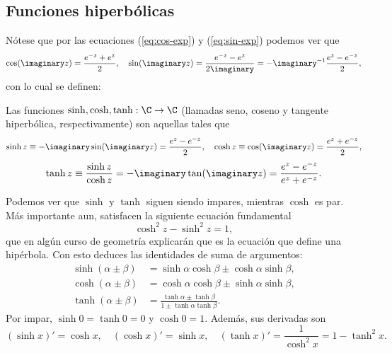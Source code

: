 \documentclass[11pt,oneside,a4paper]{book}
\begin{document}
\subsection*{Funciones hiperbólicas}
Nótese que por las ecuaciones (\ref{eq:cos-exp}) y (\ref{eq:sin-exp}) podemos ver que
$$\cos(\imaginary z)=\frac{e^{-z}+e^z}{2},\quad\sin(\imaginary z)=\frac{e^{-z}-e^z}{2\imaginary}=-\imaginary^{-1}\frac{e^z-e^{-z}}{2},$$
con lo cual se definen:
\begin{mydef}
Las funciones $\sinh,\cosh,\tanh:\C\rightarrow\C$ (llamadas seno, coseno y tangente hiperbólica, respectivamente) son aquellas tales que
$$\sinh z\equiv-\imaginary\sin(\imaginary z)=\frac{e^z-e^{-z}}{2},\quad\cosh z\equiv\cos(\imaginary z)=\frac{e^z+e^{-z}}{2},$$
$$\tanh z\equiv\frac{\sinh z}{\cosh z}=-\imaginary\tan(\imaginary z)=\frac{e^z-e^{-z}}{e^z+e^{-z}}.$$
\end{mydef}
Podemos ver que $\sinh$ y $\tanh$ siguen siendo impares, mientras $\cosh$ es par. Más importante aun, satisfacen la siguiente ecuación fundamental
\begin{equation}
\cosh^2z-\sinh^2z=1,
\end{equation}
que en algún curso de geometría explicarán que es la ecuación que define una hipérbola. Con esto deduces las identidades de suma de argumentos:
\begin{align*}
\sinh(\alpha\pm\beta)&=\sinh\alpha\cosh\beta\pm\cosh\alpha\sinh\beta,\\
\cosh(\alpha\pm\beta)&=\cosh\alpha\cosh\beta\pm\sinh\alpha\sinh\beta,\\
\tanh(\alpha\pm\beta)&=\frac{\tanh\alpha\pm\tanh\beta}{1\pm\tanh\alpha\tanh\beta}.
\end{align*}
Por impar, $\sinh0=\tanh0=0$ y $\cosh0=1$. Además, sus derivadas son
$$(\sinh x)'=\cosh x,\quad(\cosh x)'=\sinh x,\quad(\tanh x)'=\frac{1}{\cosh^2x}=1-\tanh^2x.$$
\begin{figure}
\centering
{}
\caption{}
\end{figure}
\end{document}
